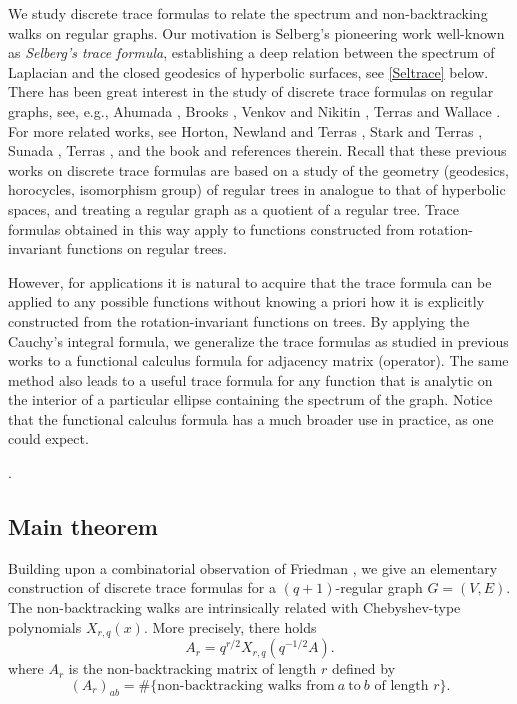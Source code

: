\documentclass{article}
\begin{document}
We study discrete trace formulas to relate the spectrum and non-backtracking walks on regular graphs. Our motivation is Selberg's pioneering work \cite{Sel56} well-known as \emph{Selberg's trace formula}, establishing a deep relation between the spectrum of Laplacian and the closed geodesics of hyperbolic surfaces, see \eqref{Seltrace} below. 
There has been great interest in the study of discrete trace formulas on regular graphs, see, e.g.,  Ahumada \cite{Ahu87},  Brooks \cite{Brooks91}, Venkov and Nikitin \cite{VN94}, Terras and Wallace \cite{TW03}. For more related works, see Horton, Newland and Terras \cite{HNT06}, Stark and Terras \cite{ST96, ST00, ST07}, Sunada \cite{Su06}, Terras \cite{Terras02}, and the book \cite{HFGO12} and references therein. Recall that these previous works on discrete trace formulas are based on a study of the geometry (geodesics, horocycles, isomorphism group) of regular trees in analogue to that of hyperbolic spaces, and treating 
a regular graph as a quotient of a regular tree. Trace formulas obtained in this way apply to functions constructed from rotation-invariant functions on regular trees. 



However, for applications it is natural to acquire that the trace formula can be applied to any possible functions without knowing a priori how it is explicitly constructed from the rotation-invariant functions on trees. By applying the Cauchy's integral formula, we generalize the trace formulas as studied in previous works to a functional calculus formula for adjacency matrix (operator). The same method also leads to a useful trace formula for any function that is analytic on the interior of a particular ellipse containing the spectrum of the graph. Notice that the functional calculus formula has a much broader use in practice, as one could expect. 


. 
  


\subsection{Main theorem}
Building upon a combinatorial observation of Friedman \cite[Lemma 3.3]{Fri91}, we give an elementary construction of discrete trace formulas for a $(q+1)$-regular graph $G=(V,E)$. The non-backtracking walks are intrinsically related with Chebyshev-type polynomials $X_{r,q}(x)$. More precisely, there holds
\begin{equation}\label{eq:introArXrq}
    A_{r}=q^{r/2}X_{r,q}(q^{-1/2}A).
\end{equation}
where $A_r$ is the non-backtracking matrix of length $r$ defined by $$(A_{r})_{ab}=\# \{\text{non-backtracking walks from} \ a \ \text{to} \ b \text{ of length } r\}.$$
\end{document}
